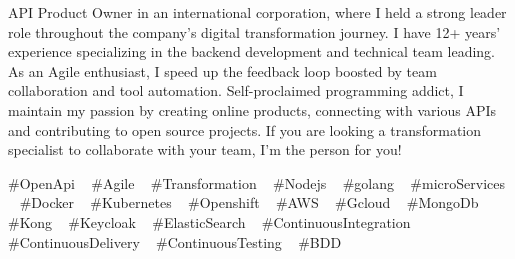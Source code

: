 

\begin{cvparagraph}

API Product Owner in an international corporation, where I held a strong leader role throughout the company's digital transformation journey. I have 12+ years’ experience specializing in the backend development and technical team leading.
As an Agile enthusiast, I speed up the feedback loop boosted by team collaboration and tool automation.
Self-proclaimed programming addict, I maintain my passion by creating online products, connecting with various APIs and contributing to open source projects. If you are looking a transformation specialist to collaborate with your team, I'm the person for you!

\end{cvparagraph}
\begin{cvtechnologies}
 \#OpenApi ~
 \#Agile ~
 \#Transformation ~
 \#Nodejs ~
 \#golang ~
 \#microServices ~
 \#Docker ~
 \#Kubernetes ~
 \#Openshift ~
 \#AWS ~
 \#Gcloud ~
 \#MongoDb ~
 \#Kong ~
 \#Keycloak ~
 \#ElasticSearch ~
 \#ContinuousIntegration ~
 \#ContinuousDelivery ~
 \#ContinuousTesting ~
 \#BDD 
\end{cvtechnologies}
